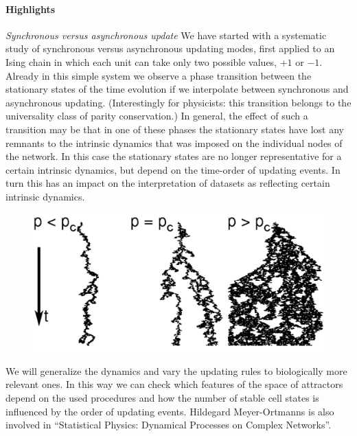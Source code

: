 \paragraph{Highlights}
%
\textit{Synchronous versus asynchronous update}
We have started with a systematic study of synchronous versus
asynchronous updating modes, first applied to an Ising chain in
which each unit can take only two possible values, $+1$ or $-1$.
Already in this simple system we observe a phase transition
between the stationary states of the time evolution
\cite{meyerortmanns1} if we interpolate between synchronous and
asynchronous updating. (Interestingly for physicists: this
transition belongs to the universality class of parity
conservation.) In general, the effect of such a transition may be
that in one of these phases the stationary states have lost any
remnants to the intrinsic dynamics that was imposed on the
individual nodes of the network. In this case the stationary
states are no longer representative for a certain intrinsic
dynamics, but depend on the time-order of updating events.
In turn this has an impact on the interpretation of datasets
as reflecting certain intrinsic dynamics.\\

\begin{figure}[ht]
  \begin{center}
    \includegraphics[width=\hsize]{Meyer-Ortmanns/meyerortmanns.pdf}
    \label{fig:meyerortmanns1}
   \end{center}
\end{figure}

We will generalize the dynamics and vary the updating rules to
biologically more relevant ones. In this way we can check which
features of the space of attractors depend on the used procedures
and how the number of stable cell states is influenced by the
order of updating events. \newline \newline Hildegard Meyer-Ortmanns is also involved in ``Statistical Physics: Dynamical Processes on Complex
Networks''.


